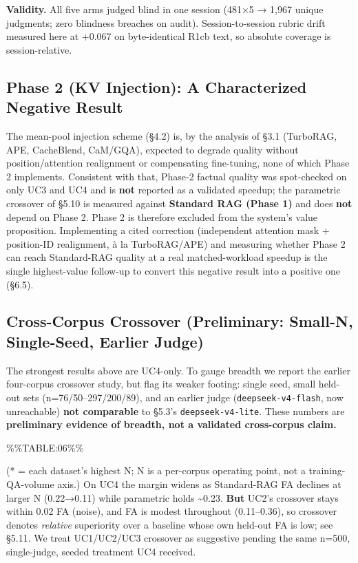 \textbf{Validity.} All five arms judged blind in one session (481×5 → 1,967 unique judgments; zero blindness breaches on audit). Session-to-session rubric drift measured here at +0.067 on byte-identical R1cb text, so absolute coverage is session-relative.

\hypertarget{phase-2-kv-injection-a-characterized-negative-result}{%
\subsection{Phase 2 (KV Injection): A Characterized Negative Result}\label{phase-2-kv-injection-a-characterized-negative-result}}

The mean-pool injection scheme (§4.2) is, by the analysis of §3.1 (TurboRAG, APE, CacheBlend, CaM/GQA), expected to degrade quality without position/attention realignment or compensating fine-tuning, none of which Phase 2 implements. Consistent with that, Phase-2 factual quality was spot-checked on only UC3 and UC4 and is \textbf{not} reported as a validated speedup; the parametric crossover of §5.10 is measured against \textbf{Standard RAG (Phase 1)} and does \textbf{not} depend on Phase 2. Phase 2 is therefore excluded from the system's value proposition. Implementing a cited correction (independent attention mask + position-ID realignment, à la TurboRAG/APE) and measuring whether Phase 2 can reach Standard-RAG quality at a real matched-workload speedup is the single highest-value follow-up to convert this negative result into a positive one (§6.5).

\hypertarget{cross-corpus-crossover-preliminary-small-n-single-seed-earlier-judge}{%
\subsection{Cross-Corpus Crossover (Preliminary: Small-N, Single-Seed, Earlier Judge)}\label{cross-corpus-crossover-preliminary-small-n-single-seed-earlier-judge}}

The strongest results above are UC4-only. To gauge breadth we report the earlier four-corpus crossover study, but flag its weaker footing: single seed, small held-out sets (n=76/50--297/200/89), and an earlier judge (\texttt{deepseek-v4-flash}, now unreachable) \textbf{not comparable} to §5.3's \texttt{deepseek-v4-lite}. These numbers are \textbf{preliminary evidence of breadth, not a validated cross-corpus claim.}

\%\%TABLE:06\%\%

(* = each dataset's highest N; N is a per-corpus operating point, not a training-QA-volume axis.) On UC4 the margin widens as Standard-RAG FA declines at larger N (0.22→0.11) while parametric holds \textasciitilde0.23. \textbf{But} UC2's crossover stays within 0.02 FA (noise), and FA is modest throughout (0.11--0.36), so crossover denotes \emph{relative} superiority over a baseline whose own held-out FA is low; see §5.11. We treat UC1/UC2/UC3 crossover as suggestive pending the same n=500, single-judge, seeded treatment UC4 received.

